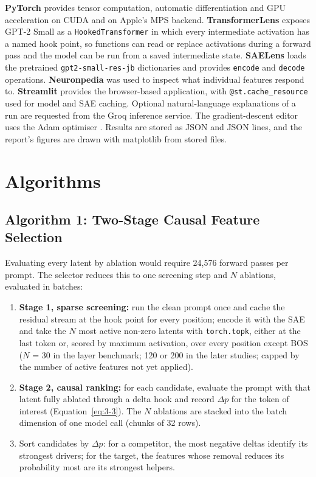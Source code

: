 \documentclass[12pt,a4paper]{report}
\begin{document}
\textbf{PyTorch} \cite{r22} provides tensor computation, automatic differentiation and GPU acceleration on CUDA and on Apple's MPS backend. \textbf{TransformerLens} \cite{r13} exposes GPT-2 Small as a \texttt{HookedTransformer} in which every intermediate activation has a named hook point, so functions can read or replace activations during a forward pass and the model can be run from a saved intermediate state. \textbf{SAELens} \cite{r14} loads the pretrained \texttt{gpt2-small-res-jb} dictionaries \cite{r15} and provides \texttt{encode} and \texttt{decode} operations. \textbf{Neuronpedia} \cite{r20} was used to inspect what individual features respond to. \textbf{Streamlit} provides the browser-based application, with \texttt{@st.\allowbreak{}cache\_\allowbreak{}resource} used for model and SAE caching. Optional natural-language explanations of a run are requested from the Groq inference service. The gradient-descent editor uses the Adam optimiser \cite{r36}. Results are stored as JSON and JSON lines, and the report's figures are drawn with matplotlib from stored files.

\section{Algorithms}

\subsection{Algorithm 1: Two-Stage Causal Feature Selection}

Evaluating every latent by ablation would require 24,576 forward passes per prompt. The selector reduces this to one screening step and $N$ ablations, evaluated in batches:

\begin{enumerate}
  \item \textbf{Stage 1, sparse screening:} run the clean prompt once and cache the residual stream at the hook point for every position; encode it with the SAE and take the $N$ most active non-zero latents with \texttt{torch.\allowbreak{}topk}, either at the last token or, scored by maximum activation, over every position except BOS ($N$ = 30 in the layer benchmark; 120 or 200 in the later studies; capped by the number of active features not yet applied).
  \item \textbf{Stage 2, causal ranking:} for each candidate, evaluate the prompt with that latent fully ablated through a delta hook and record $\Delta p$ for the token of interest (Equation~\ref{eq:3-3}). The $N$ ablations are stacked into the batch dimension of one model call (chunks of 32 rows).
  \item Sort candidates by $\Delta p$: for a competitor, the most negative deltas identify its strongest drivers; for the target, the features whose removal reduces its probability most are its strongest helpers.
\end{enumerate}
\end{document}
